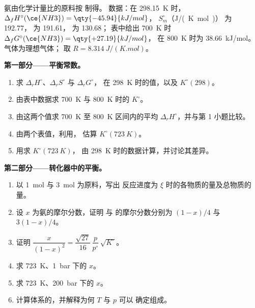 \begin{problem}
\label{pb:b2:equilibrium-shifts:1}
氨由化学计量比的原料按  制得。
数据：在 \qty{298.15}{K} 时，$\Delta_f H^\circ(\ce{NH3}) = \qty{-45.94}{kJ/mol}$，
$S^\circ_m$（\unit{J/(K.mol)}） 为 192.77， 为 191.61， 为 130.68；
表中给出 \qty{700}{K} 时 $\Delta_f G^\circ(\ce{NH3}) = \qty{+27.19}{kJ/mol}$，
在 \qty{800}{K} 时为 \qty{+38.66}{kJ/mol}。气体为理想气体；
取 $R = \qty{8.314}{J/(K.mol)}$。

\medskip
\noindent\textbf{第一部分——平衡常数。}
\begin{enumerate}
  \item 求 $\Delta_r H^\circ$、$\Delta_r S^\circ$ 与 $\Delta_r G^\circ$，
        在 \qty{298}{K} 时的值，以及 $K^\circ(298)$。
  \item 由表中数据求 \qty{700}{K} 与 \qty{800}{K} 时的 $K^\circ$。
  \item 由这两个值求 \qty{700}{K} 至
        \qty{800}{K} 区间内的平均 $\Delta_r H^\circ$，并与第 1 小题比较。
  \item 由两个表值，利用，
        估算 $K^\circ(\qty{723}{K})$。
  \item 用求 $K^\circ(\qty{723}{K})$，
        由 \qty{298}{K} 时的数据计算，并讨论其差异。
\end{enumerate}

\medskip
\noindent\textbf{第二部分——转化器中的平衡。}
\begin{enumerate}[resume]
  \item 以 \qty{1}{mol}  与 \qty{3}{mol}  为原料，写出
        反应进度为 $\xi$ 时的各物质的量及总物质的量。
  \item 设 $x$ 为氨的摩尔分数，证明
         与  的摩尔分数分别为 $(1-x)/4$ 与 $3(1-x)/4$。
  \item 证明 $\dfrac{x}{(1-x)^2} = \dfrac{\sqrt{27}}{16}\,\dfrac{p}{p^\circ}\,
        \sqrt{K^\circ}$。
  \item 求 \qty{723}{K}、\qty{1}{bar} 下的 $x$。
  \item 求 \qty{723}{K}、\qty{200}{bar} 下的 $x$。
  \item 计算体系的，并解释为何 $T$ 与 $p$ 可以
        确定组成。
\end{enumerate}


\end{problem}
